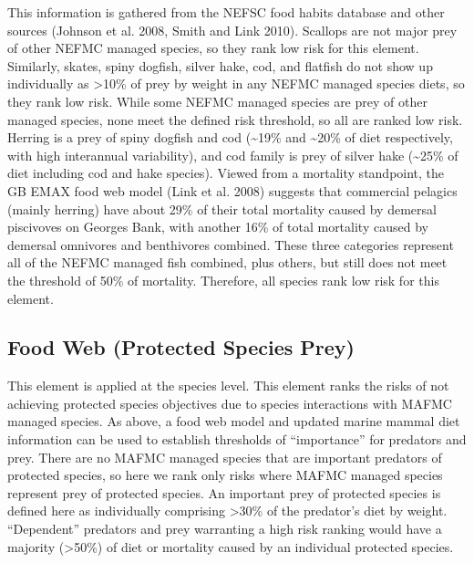 \documentclass[11pt,]{article}
\begin{document}
This information is gathered from the NEFSC food habits database and
other sources (Johnson et al. 2008, Smith and Link 2010). Scallops are
not major prey of other NEFMC managed species, so they rank low risk for
this element. Similarly, skates, spiny dogfish, silver hake, cod, and
flatfish do not show up individually as \textgreater{}10\% of prey by
weight in any NEFMC managed species diets, so they rank low risk. While
some NEFMC managed species are prey of other managed species, none meet
the defined risk threshold, so all are ranked low risk. Herring is a
prey of spiny dogfish and cod (\textasciitilde{}19\% and
\textasciitilde{}20\% of diet respectively, with high interannual
variability), and cod family is prey of silver hake
(\textasciitilde{}25\% of diet including cod and hake species). Viewed
from a mortality standpoint, the GB EMAX food web model (Link et al.
2008) suggests that commercial pelagics (mainly herring) have about 29\%
of their total mortality caused by demersal piscivoves on Georges Bank,
with another 16\% of total mortality caused by demersal omnivores and
benthivores combined. These three categories represent all of the NEFMC
managed fish combined, plus others, but still does not meet the
threshold of 50\% of mortality. Therefore, all species rank low risk for
this element.

\subsection{Food Web (Protected Species
Prey)}\label{food-web-protected-species-prey}

This element is applied at the species level. This element ranks the
risks of not achieving protected species objectives due to species
interactions with MAFMC managed species. As above, a food web model and
updated marine mammal diet information can be used to establish
thresholds of ``importance'' for predators and prey. There are no MAFMC
managed species that are important predators of protected species, so
here we rank only risks where MAFMC managed species represent prey of
protected species. An important prey of protected species is defined
here as individually comprising \textgreater{}30\% of the predator's
diet by weight. ``Dependent'' predators and prey warranting a high risk
ranking would have a majority (\textgreater{}50\%) of diet or mortality
caused by an individual protected species.
\end{document}
